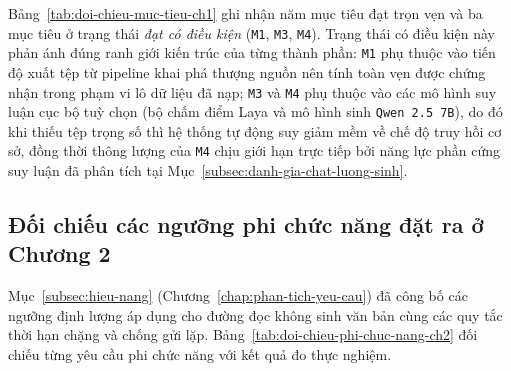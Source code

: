 Bảng~\ref{tab:doi-chieu-muc-tieu-ch1} ghi nhận năm mục tiêu đạt trọn vẹn và ba mục tiêu ở trạng thái \textit{đạt có điều kiện} (\texttt{M1}, \texttt{M3}, \texttt{M4}). Trạng thái có điều kiện này phản ánh đúng ranh giới kiến trúc của từng thành phần: \texttt{M1} phụ thuộc vào tiến độ xuất tệp từ pipeline khai phá thượng nguồn nên tính toàn vẹn được chứng nhận trong phạm vi lô dữ liệu đã nạp; \texttt{M3} và \texttt{M4} phụ thuộc vào các mô hình suy luận cục bộ tuỳ chọn (bộ chấm điểm Laya và mô hình sinh \texttt{Qwen 2.5 7B}), do đó khi thiếu tệp trọng số thì hệ thống tự động suy giảm mềm về chế độ truy hồi cơ sở, đồng thời thông lượng của \texttt{M4} chịu giới hạn trực tiếp bởi năng lực phần cứng suy luận đã phân tích tại Mục~\ref{subsec:danh-gia-chat-luong-sinh}.

\subsection{Đối chiếu các ngưỡng phi chức năng đặt ra ở Chương 2}
\label{subsec:doi-chieu-phi-chuc-nang-ch2}

Mục~\ref{subsec:hieu-nang} (Chương~\ref{chap:phan-tich-yeu-cau}) đã công bố các ngưỡng định lượng áp dụng cho đường đọc không sinh văn bản cùng các quy tắc thời hạn chặng và chống gửi lặp. Bảng~\ref{tab:doi-chieu-phi-chuc-nang-ch2} đối chiếu từng yêu cầu phi chức năng với kết quả đo thực nghiệm.

